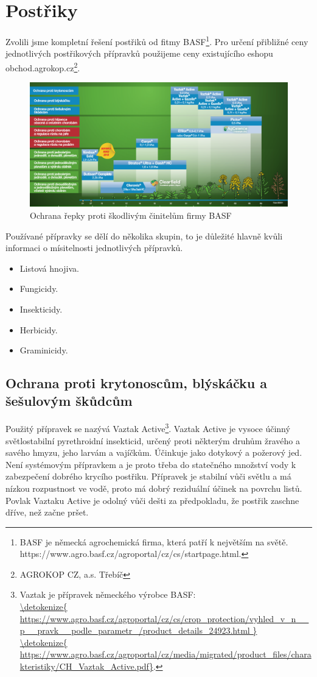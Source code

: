 
\section{Postřiky}
Zvolili jsme kompletní řešení postřiků od fitmy BASF\footnote{BASF je německá agrochemická firma, která patří k 
největším na světě.\\https://www.agro.basf.cz/agroportal/cz/cs/startpage.html.}.
Pro určení přibližné ceny jednotlivých postřikových přípravků použijeme ceny existujícího eshopu obchod.agrokop.cz\footnote{AGROKOP CZ, a.s. Třebíč}.
\begin{figure}[ht!]
\centering
\includegraphics[width=170mm]{img/postriky}
\caption{Ochrana řepky proti škodlivým činitelům firmy BASF \label{basf_postriky}}
\end{figure}
Používané přípravky se dělí do několika skupin, to je důležité hlavně kvůli informaci o mísitelnosti jednotlivých přípravků.
\begin{itemize}
  \item Listová hnojiva.
  \item Fungicidy.
  \item Insekticidy.
  \item Herbicidy.
  \item Graminicidy.
\end{itemize}

\subsection{Ochrana proti krytonoscům, blýskáčku a šešulovým škůdcům}
Použitý přípravek se nazývá Vaztak Active\footnote{Vaztak je přípravek německého výrobce BASF: \\\url{\detokenize{
https://www.agro.basf.cz/agroportal/cz/cs/crop_protection/vyhled_v_n__p__pravk__podle_parametr_/product_details_24923.html
}}
\\\url{\detokenize{
https://www.agro.basf.cz/agroportal/cz/media/migrated/product_files/charakteristiky/CH_Vaztak_Active.pdf}}.}.
Vaztak Active je vysoce účinný světlostabilní pyrethroidní insekticid, určený proti 
některým  druhům  žravého  a  savého  hmyzu,  jeho  larvám  a  vajíčkům.  Účinkuje  
jako dotykový a požerový jed. Není systémovým přípravkem a je proto třeba do statečného množství vody k zabezpečení dobrého krycího postřiku. Přípravek je 
stabilní vůči světlu a má nízkou rozpustnost ve vodě, proto má dobrý reziduální 
účinek na povrchu listů. Povlak Vaztaku Active je odolný vůči dešti za předpokladu, že postřik zaschne dříve, než začne pršet.

